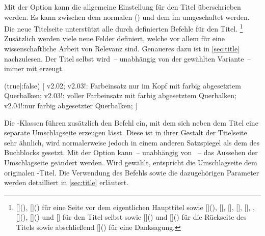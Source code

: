 \begin{DeclareEntity*}{}
\begin{DeclareEntity*}{}
\begin{DeclareEntity*}{}
\begin{Declaration}
Mit der Option  kann die allgemeine Einstellung für den Titel 
überschrieben werden. Es kann zwischen dem normalen () 
und dem im \CD umgeschaltet werden. Die neue Titelseite unterstützt alle durch 
\KOMAScript definierten Befehle für den Titel.%
\footnote{%
  [](),
  []() für eine 
  Seite vor dem eigentlichen Haupttitel sowie
  [](),
  [], [],
  [], [],
  , [](), 
  []() und 
  [] für den Titel selbst sowie 
  []() und
  []() 
  für die Rückseite des Titels sowie abschließend 
  []() für eine 
  Danksagung.
}
Zusätzlich werden viele neue Felder definiert, welche vor allem für eine 
wissenschaftliche Arbeit von Relevanz sind. Genaueres dazu ist in 
\autoref{sec:title} nachzulesen. Der Titel selbst wird~-- unabhängig von der 
gewählten Variante~-- immer mit  erzeugt.
\end{Declaration}

\begin{Declaration}
  {}
  (true|:false)
[%
  v2.02;%
  v2.03!:%
    Farbeinsatz nur im Kopf mit farbig abgesetztem Querbalken;
  v2.03!:%
    voller Farbeinsatz mit farbig abgesetztem Querbalken;
  v2.04!:nur farbig abgesetzter Querbalken;%
]
\printdeclarationlist[Umschlagseite|?]

Die \TUDScript-Klassen führen zusätzlich den Befehl  ein, mit 
dem sich neben dem Titel eine separate Umschlagseite erzeugen lässt. Diese ist 
in ihrer Gestalt der Titelseite sehr ähnlich, wird normalerweise jedoch in 
einem anderen Satzspiegel als dem des Buchblocks gesetzt. Mit der Option 
 kann~-- unabhängig von ~-- das Aussehen der 
Umschlagseite geändert werden. Wird  gewählt, entspricht 
die Umschlagseite dem originalen \KOMAScript-Titel. Die Verwendung des Befehls 
 sowie die dazugehörigen Parameter werden detailliert in 
\autoref{sec:title} erläutert.
\end{Declaration}


\end{DeclareEntity*}
\end{DeclareEntity*}
\end{DeclareEntity*}
